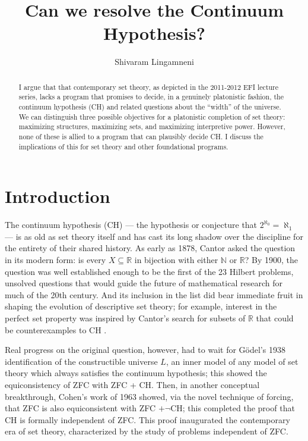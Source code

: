 \documentclass[letterpaper,12pt]{article}
\newcommand{\N}{\mathbb{N}}
\newcommand{\R}{\mathbb{R}}
\begin{document}


\title{Can we resolve the Continuum Hypothesis?}
\author{Shivaram Lingamneni}
\maketitle


\begin{abstract}
I argue that that contemporary set theory, as depicted in the 2011-2012 EFI lecture series, lacks a program that promises to decide, in a genuinely platonistic fashion, the continuum hypothesis (CH) and related questions about the ``width'' of the universe. We can distinguish three possible objectives for a platonistic completion of set theory: maximizing structures, maximizing sets, and maximizing interpretive power. However, none of these is allied to a program that can plausibly decide CH. I discuss the implications of this for set theory and other foundational programs.
\end{abstract}

\section{Introduction}
The continuum hypothesis (CH) --- the hypothesis or conjecture that $2^{\aleph_0} = \aleph_1$ --- is as old as set theory itself and has cast its long shadow over the discipline for the entirety of their shared history. As early as 1878, Cantor asked the question in its modern form: is every $X \subseteq \R$ in bijection with either $\N$ or $\R$? By 1900, the question was well established enough to be the first of the 23 Hilbert problems, unsolved questions that would guide the future of mathematical research for much of the 20th century. And its inclusion in the list did bear immediate fruit in shaping the evolution of descriptive set theory; for example, interest in the perfect set property was inspired by Cantor's search for subsets of $\mathbb{R}$ that could be counterexamples to CH \citep{kanamori2008higher}.

Real progress on the original question, however, had to wait for G\"odel's 1938 identification of the constructible universe $L$, an inner model of any model of set theory which always satisfies the continuum hypothesis; this showed the equiconsistency of ZFC with ZFC + CH. Then, in another conceptual breakthrough, Cohen's work of 1963 showed, via the novel technique of forcing, that ZFC is also equiconsistent with ZFC $+ \neg \mathrm{CH}$; this completed the proof that CH is formally independent of ZFC. This proof inaugurated the contemporary era of set theory, characterized by the study of problems independent of ZFC.
\end{document}
